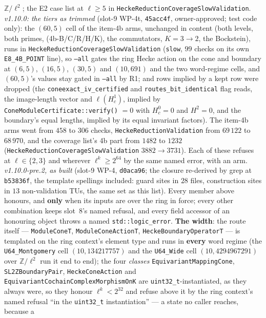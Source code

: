\documentclass[11pt]{article}
\theoremstyle{remark}
\newcommand{\Z}{\mathbb{Z}}
\begin{document}
\begin{enumerate}[label=(b\arabic*)]
\begin{itemize}
    $\Z/\ell^2$; the E2 case list at $\ell\ge5$ in \texttt{HeckeReductionCoverageSlowValidation}.
    \emph{v1.10.0: the tiers as trimmed} (slot-9 WP-4t, \texttt{45acc4f}, owner-approved; test
    code only): the $(60,5)$ cell of the item-4b arms, unchanged in content (both levels, both
    primes, (4b-B/C/R/H/K), the commutators, $K=3\to2$, the Bockstein), runs in
    \texttt{HeckeReductionCoverageSlowValidation} (\texttt{slow}, $99$ checks on its own
    \texttt{E8\_4B\_POINT} line), so \texttt{--all} gates the ring Hecke action on the cone and
    boundary at $(6,5)$, $(16,5)$, $(30,5)$ and $(10,691)$ and the two word-regime cells, and
    $(60,5)$'s values stay gated in \texttt{--all} by R1; and rows implied by a kept row were
    dropped (the \texttt{coneexact\_iv\_certified} and \texttt{routes\_bit\_identical} flag reads,
    the image-length vector and $\ell(H^1_c)$, implied by \texttt{ConeModuleCertificate::verify()}
    $=0$ with $H^0_c=0$ and $H^2=0$, and the boundary's equal lengths, implied by its equal
    invariant factors). The item-4b arms went from $458$ to $306$ checks,
    \texttt{HeckeReductionValidation} from $69\,122$ to $68\,970$, and the coverage list's 4b part
    from $1482$ to $1232$ (\texttt{HeckeReductionCoverageSlowValidation} $3882\to3731$).
    Each of these refuses at $\ell\in\{2,3\}$ and wherever $\ell^k\ge2^{64}$ by the same named
    error, with an arm. \emph{v1.10.0-pre.2, as built} (slot-9 WP-4, \texttt{d0aca96}; the closure
    re-derived by grep at \texttt{b53836f}, the template spellings included: guard sites in $28$
    files, construction sites in $13$ non-validation TUs, the same set as this list). Every
    member above honours, and \textbf{only} when its inputs are over the ring in force; every
    other combination keeps slot~8's named refusal, and every field accessor of an honouring
    object throws a named \texttt{std::logic\_error}. \textbf{The width}: the route itself ---
    \texttt{ModuleConeT}, \texttt{ModuleConeActionT}, \texttt{HeckeBoundaryOperatorT} --- is
    templated on the ring context's element type and runs in \textbf{every} word regime (the
    \texttt{U64\_Montgomery} cell $(10,134217757)$ and the \texttt{U64\_Wide} cell
    $(10,4294967291)$ over $\Z/\ell^2$ run it end to end); the four \emph{classes}
    \texttt{EquivariantMappingCone}, \texttt{SL2ZBoundaryPair}, \texttt{HeckeConeAction} and
    \texttt{EquivariantCochainComplexMorphismOnK} are \texttt{uint32\_t}-instantiated, as they
    always were, so they honour $\ell^k<2^{32}$ and refuse above it by the ring context's named
    refusal ``in the \texttt{uint32\_t} instantiation'' --- a state no caller reaches, because a

\end{itemize}
\end{enumerate}
\end{document}
